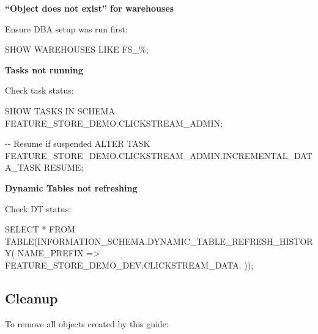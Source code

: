 \documentclass[
  letterpaper,
  DIV=11,
  numbers=noendperiod]{scrreprt}
\newenvironment{Shaded}{\begin{snugshade}}{\end{snugshade}}
\newcommand{\CommentTok}[1]{\textcolor[rgb]{0.37,0.37,0.37}{#1}}
\newcommand{\KeywordTok}[1]{\textcolor[rgb]{0.00,0.23,0.31}{#1}}
\newcommand{\NormalTok}[1]{\textcolor[rgb]{0.00,0.23,0.31}{#1}}
\newcommand{\OperatorTok}[1]{\textcolor[rgb]{0.37,0.37,0.37}{#1}}
\newcommand{\StringTok}[1]{\textcolor[rgb]{0.13,0.47,0.30}{#1}}
\begin{document}
\textbf{``Object does not exist'' for warehouses}

Ensure DBA setup was run first:

\begin{Shaded}
\begin{Highlighting}[]
\NormalTok{SHOW WAREHOUSES }\KeywordTok{LIKE} \StringTok{\textquotesingle{}FS\_\%\textquotesingle{}}\NormalTok{;}
\end{Highlighting}
\end{Shaded}

\textbf{Tasks not running}

Check task status:

\begin{Shaded}
\begin{Highlighting}[]
\NormalTok{SHOW TASKS }\KeywordTok{IN} \KeywordTok{SCHEMA}\NormalTok{ FEATURE\_STORE\_DEMO.CLICKSTREAM\_ADMIN;}

\CommentTok{{-}{-} Resume if suspended}
\KeywordTok{ALTER}\NormalTok{ TASK FEATURE\_STORE\_DEMO.CLICKSTREAM\_ADMIN.INCREMENTAL\_DATA\_TASK }\KeywordTok{RESUME}\NormalTok{;}
\end{Highlighting}
\end{Shaded}

\textbf{Dynamic Tables not refreshing}

Check DT status:

\begin{Shaded}
\begin{Highlighting}[]
\KeywordTok{SELECT} \OperatorTok{*} \KeywordTok{FROM} \KeywordTok{TABLE}\NormalTok{(INFORMATION\_SCHEMA.DYNAMIC\_TABLE\_REFRESH\_HISTORY(}
\NormalTok{    NAME\_PREFIX }\OperatorTok{=\textgreater{}} \StringTok{\textquotesingle{}FEATURE\_STORE\_DEMO\_DEV.CLICKSTREAM\_DATA.\textquotesingle{}}
\NormalTok{));}
\end{Highlighting}
\end{Shaded}

\hypertarget{cleanup}{%
\subsection{Cleanup}\label{cleanup}}

To remove all objects created by this guide:
\end{document}
